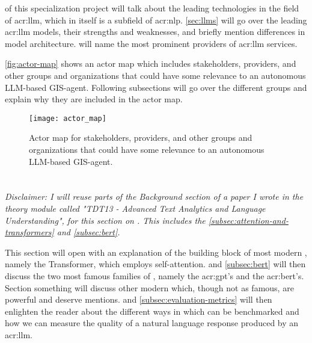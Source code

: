  of this specialization project will talk about the leading technologies in the field of \gls{acr:llm}, which in itself is a subfield of \gls{acr:nlp}. \autoref{sec:llms} will go over the leading \gls{acr:llm} models, their strengths and weaknesses, and briefly mention differences in model architecture.  will name the most prominent providers of \gls{acr:llm} services.

\autoref{fig:actor-map} shows an actor map which includes stakeholders, providers, and other groups and organizations that could have some relevance to an autonomous LLM-based GIS-agent. Following subsections will go over the different groups and explain why they are included in the actor map.

\begin{figure}
    \texttt{[image: actor\_map]}
    \caption{Actor map for stakeholders, providers, and other groups and organizations that could have some relevance to an autonomous LLM-based GIS-agent.}
    \label{fig:actor-map}
\end{figure}

\section[Large Language Models]{}\label{sec:llms}

\textit{Disclaimer: I will reuse parts of the Background section of a paper I wrote in the theory module called "TDT13 - Advanced Text Analytics and Language Understanding", for this section on . This includes the \autoref{subsec:attention-and-transformers} and \autoref{subsec:bert}.}

\vspace{12pt}

This section will open with an explanation of the building block of most  modern , namely the Transformer, which employs self-attention.  and \autoref{subsec:bert} will then discuss the two most famous families of , namely the \acrshort{acr:gpt}'s and the \acrshort{acr:bert}'s. Section something will discuss other modern  which, though not as famous, are powerful and deserve mentions.  and \autoref{subsec:evaluation-metrics} will then enlighten the reader about the different ways in which  can be benchmarked and how we can measure the quality of a natural language response produced by an \acrshort{acr:llm}.

